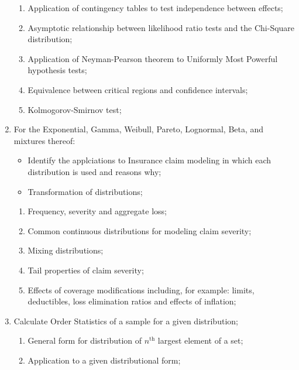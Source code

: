 \documentclass[12pt, titlepage, french]{report}
\begin{document}
\begin{outcomes}
\begin{enumerate}
\begin{knowledge}
\begin{enumerate}[label = \alph*.]
	\item	Application of contingency tables to test independence between effects;
	\item	Asymptotic relationship between likelihood ratio tests and the Chi-Square distribution;
	\item	Application of Neyman-Pearson theorem to Uniformly Most Powerful hypothesis tests;
	\item	Equivalence between critical regions and confidence intervals;
	\item	Kolmogorov-Smirnov test;
	\end{enumerate}
	\end{knowledge}
\tcbline
	\item	For the Exponential, Gamma, Weibull, Pareto, Lognormal, Beta, and mixtures thereof:
		\begin{itemize}
		\item	Identify the applciations to Insurance claim modeling in which each distribution is used and reasons why;
		\item	Transformation of distributions; 
		\end{itemize}
	\begin{knowledge}
	\begin{enumerate}[label = \alph*.]
	\item	Frequency, severity and aggregate loss;
	\item	Common continuous distributions for modeling claim severity;
	\item	Mixing distributions;
	\item	Tail properties of claim severity;
	\item	Effects of coverage modifications including, for example: limits, deductibles, loss elimination ratios and effects of inflation;
	\end{enumerate}
	\end{knowledge}
\tcbline
	\item	Calculate Order Statistics of a sample for a given distribution;
	\begin{knowledge}
	\begin{enumerate}[label = \alph*.]
	\item	General form for distribution of $n^{\text{th}}$ largest element of a set;
	\item	Application to a given distributional form;
	\end{enumerate}
	\end{knowledge}
\end{enumerate}
\end{outcomes}
\end{document}
